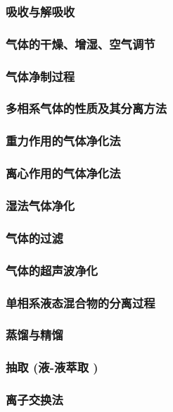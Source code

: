 \documentclass[UTF8]{../../ApplicationUniverse}
\begin{document}
        \subsubsection{吸收与解吸收}
        \subsubsection{气体的干燥、增湿、空气调节}
    \subsubsection{气体净制过程}
        \subsubsection{多相系气体的性质及其分离方法}
        \subsubsection{重力作用的气体净化法}
        \subsubsection{离心作用的气体净化法}
        \subsubsection{湿法气体净化}
        \subsubsection{气体的过滤}
        \subsubsection{气体的超声波净化}
    \subsubsection{单相系液态混合物的分离过程}
        \subsubsection{蒸馏与精馏}
        \subsubsection{抽取 (液-液萃取 )}
        \subsubsection{离子交换法}
\end{document}
